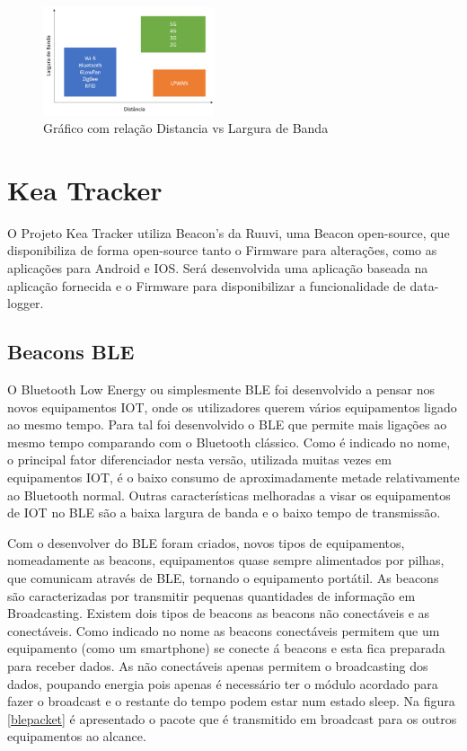 \begin{figure}[ht]
\centering
\includegraphics[width=0.45\textwidth]{images/lpwan.png}
\caption{Gráfico com relação Distancia vs Largura de Banda\cite{masterthesisLPWAN}}\label{figgraphlpwan}
\end{figure}



\section {Kea Tracker}\label{kea}
O Projeto Kea Tracker utiliza Beacon’s da Ruuvi, uma Beacon open-source\cite{ruuvi}, que disponibiliza de forma open-source tanto o Firmware para alterações, como as aplicações para Android e IOS. Será desenvolvida uma aplicação baseada na aplicação fornecida e o Firmware para disponibilizar a funcionalidade de data-logger.
\subsection{Beacons BLE}
\par
O Bluetooth Low Energy ou simplesmente BLE foi desenvolvido a pensar nos novos equipamentos IOT, onde os utilizadores querem vários equipamentos ligado ao mesmo tempo. Para tal foi desenvolvido o BLE que permite mais ligações ao mesmo tempo comparando com o Bluetooth clássico.
Como é indicado no nome, o principal fator diferenciador nesta versão, utilizada muitas vezes em equipamentos IOT, é o baixo consumo de aproximadamente metade relativamente ao Bluetooth normal. Outras características melhoradas a visar os equipamentos de IOT no BLE são a baixa largura de banda e o baixo tempo de transmissão.

Com o desenvolver do BLE foram criados, novos tipos de equipamentos, nomeadamente as beacons, equipamentos quase sempre alimentados por pilhas, que comunicam através de BLE, tornando o equipamento portátil. As beacons são caracterizadas por transmitir pequenas quantidades de informação em Broadcasting.
Existem dois tipos de beacons as beacons não conectáveis e as conectáveis\cite{blepacket}. Como indicado no nome as beacons conectáveis permitem que um equipamento (como um smartphone) se conecte á beacons e esta fica preparada para receber dados. As não conectáveis apenas permitem o broadcasting dos dados, poupando energia pois apenas é necessário ter o módulo acordado para fazer o broadcast e o restante do tempo podem estar num estado sleep. Na figura \ref{blepacket} é apresentado o pacote que é transmitido em broadcast para os outros equipamentos ao alcance.

